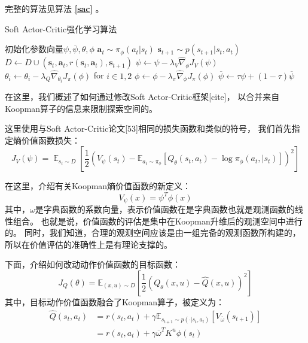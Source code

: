 \documentclass[AutoFakeBold]{LZUThesis}
\begin{document}
完整的算法见算法 \textbf{\ref{sac}} 。

\begin{algorithm}[H]
  \caption{Soft Actor-Critic强化学习算法}
  \label{sac}
  \begin{algorithmic}[1]
    \State 初始化参数向量$\psi, \overline{\psi},\theta,\phi$
	\State $\mathbf{a}_t \sim \pi_\phi(a_t | s_t)$
	\State $\mathbf{s}_{t + 1} \sim p(s_{t + 1} | s_t, a_t)$
	\State $D \leftarrow D \cup { (\mathbf{s}_t, \mathbf{a}_t, r(\mathbf{s}_t, \mathbf{a}_t), \mathbf{s}_{t + 1}) }$
      \EndFor
	\State $\psi \leftarrow \psi - \lambda_V \hat{\nabla}_\phi J_V(\psi)$
	\State $\theta_i \leftarrow \theta_i - \lambda_Q \hat{\nabla}_{\theta_i} J_\pi(\phi)$ for $i \in {1, 2}$
	\State $\phi \leftarrow \phi - \lambda_\pi \hat{\nabla}_\phi J_\pi(\phi)$
	\State $\overline{\psi} \leftarrow \tau \psi + (1 - \tau) \overline{\psi}$
      \EndFor
    \EndFor
  \end{algorithmic}
\end{algorithm}

在这里，我们概述了如何通过修改Soft Actor-Critic框架[cite]，
以合并来自Koopman算子的信息来限制探索空间的。

这里使用与Soft Actor-Critic论文[53]相同的损失函数和类似的符号，
我们首先指定熵价值函数损失：
\begin{equation}
  J_{V}(\psi) = \mathop{\mathbb{E}}_{s_t \sim D}
  \left[ \frac12 ( V_{\psi}(s_t) - \mathbb{E}_{a_t \sim \pi_{\phi}}
  \left[ Q_\theta(s_t, a_t) - \log \pi_{\phi}(a_t, | s_t) \right] )^2 \right]
\end{equation}

在这里，介绍有关Koopman熵价值函数的新定义：
\begin{equation}
  V_\psi(x) = \psi^T \phi(x)
\end{equation}
其中，$\omega$是字典函数的系数向量，表示价值函数在是字典函数也就是观测函数的线性组合。
也就是说，价值函数的评估是集中在Koopman升维后的观测空间中进行的。
同时，我们知道，合理的观测空间应该是由一组完备的观测函数所构建的，
所以在价值评估的准确性上是有理论支撑的。

下面，介绍如何改动动作价值函数的目标函数：
\begin{equation}
  J_Q(\theta) = \mathbb{E}_{(x, u) \sim D} \left[ \frac12 \left( 
  Q_\theta(x, u) - \hat{Q}(x, u) \right)^2 \right]
\end{equation}
其中，目标动作价值函数融合了Koopman算子，被定义为：
\begin{equation}
  \begin{aligned}
    \hat{Q}(s_t, a_t) &= r(s_t, a_t) + 
    \gamma \mathbb{E}_{s_{t + 1} \sim p(\cdot | s_t, a_t)}
    \left[ V_{\overline{\omega}}(s_{t + 1}) \right] \\
    &= r(s_t, a_t) + 
    \gamma \overline{\omega}^T K^u \phi(s_t)
  \end{aligned}
\end{equation}
\end{document}
